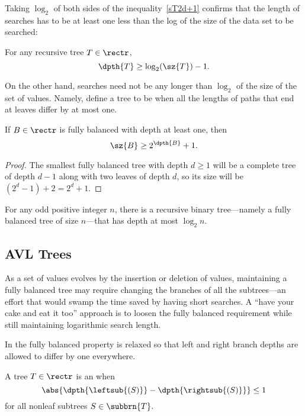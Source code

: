 \begin{definition}
Taking $\log_2$ of both sides of the inequality~\eqref{sT2d+1}
confirms that the length of searches has to be at least one less than
the log of the size of the data set to be searched:

\begin{corollary}
For any recursive tree $T \in \rectr$,
\begin{equation}\label{}
\dpth{T} \geq \log_2(\sz{T}) - 1.
\end{equation}
\end{corollary}

On the other hand, searches need not be any longer than $\log_2$ of the
size of the set of values.  Namely, define a tree to be  when all the lengths of paths that end at leaves differ by
at most one.

\begin{theorem}\label{b>2d}
If $B \in \rectr$ is fully balanced with depth at least one, then
\[
\sz{B} \geq 2^{\dpth{B}} + 1.
\]

\begin{proof}
The smallest fully balanced tree with depth $d \geq 1$ will be a complete
tree of depth $d-1$ along with two leaves of depth $d$, so its size
will be $(2^d-1) + 2 = 2^d+1$.
\end{proof}
\end{theorem}

\begin{corollary}
For any odd positive integer $n$, there is a recursive binary
tree---namely a fully balanced tree of size $n$---that has depth at
most $\log_2 n$.
\end{corollary}

\subsection{AVL Trees}

As a set of values evolves by the insertion or deletion of
values, maintaining a fully balanced tree may require changing the
branches of all the subtrees---an effort that would swamp the time
saved by having short searches.  A ``have your cake and eat it too''
approach is to loosen the fully balanced requirement while still
maintaining logarithmic search length.

In  the fully balanced property is relaxed so that
left and right branch depths are allowed to differ by one everywhere.

\begin{definition}
A tree $T\in \rectr$ is an  when
\[
\abs{\dpth{\leftsub{(S)}} - \dpth{\rightsub{(S)}}} \leq 1
\]
for all nonleaf subtrees $S \in \subbrn{T}$.
\end{definition}


\end{definition}
